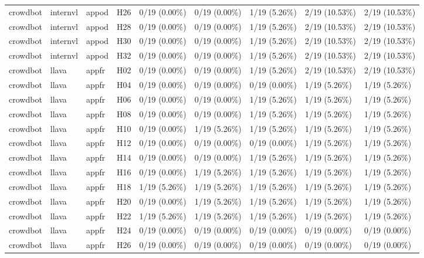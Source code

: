 \begin{longtable}{lllllllll}
crowdbot & internvl & appod & H26 & 0/19 (0.00\%) & 0/19 (0.00\%) & 1/19 (5.26\%) & 2/19 (10.53\%) & 2/19 (10.53\%) \\
crowdbot & internvl & appod & H28 & 0/19 (0.00\%) & 0/19 (0.00\%) & 1/19 (5.26\%) & 2/19 (10.53\%) & 2/19 (10.53\%) \\
crowdbot & internvl & appod & H30 & 0/19 (0.00\%) & 0/19 (0.00\%) & 1/19 (5.26\%) & 2/19 (10.53\%) & 2/19 (10.53\%) \\
crowdbot & internvl & appod & H32 & 0/19 (0.00\%) & 0/19 (0.00\%) & 1/19 (5.26\%) & 2/19 (10.53\%) & 2/19 (10.53\%) \\
crowdbot & llava & appfr & H02 & 0/19 (0.00\%) & 0/19 (0.00\%) & 1/19 (5.26\%) & 2/19 (10.53\%) & 2/19 (10.53\%) \\
crowdbot & llava & appfr & H04 & 0/19 (0.00\%) & 0/19 (0.00\%) & 0/19 (0.00\%) & 1/19 (5.26\%) & 1/19 (5.26\%) \\
crowdbot & llava & appfr & H06 & 0/19 (0.00\%) & 0/19 (0.00\%) & 1/19 (5.26\%) & 1/19 (5.26\%) & 1/19 (5.26\%) \\
crowdbot & llava & appfr & H08 & 0/19 (0.00\%) & 0/19 (0.00\%) & 1/19 (5.26\%) & 1/19 (5.26\%) & 1/19 (5.26\%) \\
crowdbot & llava & appfr & H10 & 0/19 (0.00\%) & 1/19 (5.26\%) & 1/19 (5.26\%) & 1/19 (5.26\%) & 1/19 (5.26\%) \\
crowdbot & llava & appfr & H12 & 0/19 (0.00\%) & 0/19 (0.00\%) & 0/19 (0.00\%) & 1/19 (5.26\%) & 1/19 (5.26\%) \\
crowdbot & llava & appfr & H14 & 0/19 (0.00\%) & 0/19 (0.00\%) & 1/19 (5.26\%) & 1/19 (5.26\%) & 1/19 (5.26\%) \\
crowdbot & llava & appfr & H16 & 0/19 (0.00\%) & 1/19 (5.26\%) & 1/19 (5.26\%) & 1/19 (5.26\%) & 1/19 (5.26\%) \\
crowdbot & llava & appfr & H18 & 1/19 (5.26\%) & 1/19 (5.26\%) & 1/19 (5.26\%) & 1/19 (5.26\%) & 1/19 (5.26\%) \\
crowdbot & llava & appfr & H20 & 0/19 (0.00\%) & 1/19 (5.26\%) & 1/19 (5.26\%) & 1/19 (5.26\%) & 1/19 (5.26\%) \\
crowdbot & llava & appfr & H22 & 1/19 (5.26\%) & 1/19 (5.26\%) & 1/19 (5.26\%) & 1/19 (5.26\%) & 1/19 (5.26\%) \\
crowdbot & llava & appfr & H24 & 0/19 (0.00\%) & 0/19 (0.00\%) & 0/19 (0.00\%) & 0/19 (0.00\%) & 0/19 (0.00\%) \\
crowdbot & llava & appfr & H26 & 0/19 (0.00\%) & 0/19 (0.00\%) & 0/19 (0.00\%) & 0/19 (0.00\%) & 0/19 (0.00\%) \\

\end{longtable}
